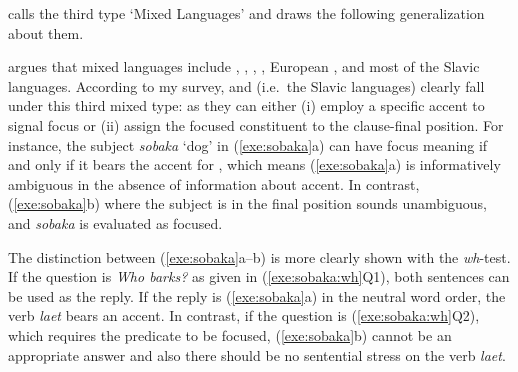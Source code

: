 \citet{buring:10} calls the third type `Mixed Languages' and draws the
following generalization about them.




\noindent \citeauthor{buring:10} argues that mixed languages include
, , , , European
, and most of the Slavic languages. According to my
survey,  and  (i.e.\ the
Slavic languages) clearly fall under this third mixed type: as they
can either (i) employ a specific accent to signal focus or (ii) assign
the focused constituent to the clause-final position.
For instance, the subject \textit{sobaka} `dog' in (\ref{exe:sobaka}a)
can have focus meaning if and only if it bears the accent for ,
which means (\ref{exe:sobaka}a) is informatively ambiguous in the
absence of information about accent.  In contrast, (\ref{exe:sobaka}b)
where the subject is in the final position sounds unambiguous, and
\textit{sobaka} is evaluated as focused.




 
\noindent The distinction between (\ref{exe:sobaka}a--b) is more
clearly shown with the \textit{wh}-test. If the
question is \textit{Who barks?} as given in (\ref{exe:sobaka:wh}Q1),
both sentences can be used as the reply. If the reply is
(\ref{exe:sobaka}a) in the neutral word order, the verb \textit{laet}
bears an accent. In contrast, if the question is
(\ref{exe:sobaka:wh}Q2), which requires the predicate to be focused,
(\ref{exe:sobaka}b) cannot be an appropriate answer and also there
should be no sentential stress on the verb \textit{laet}.





